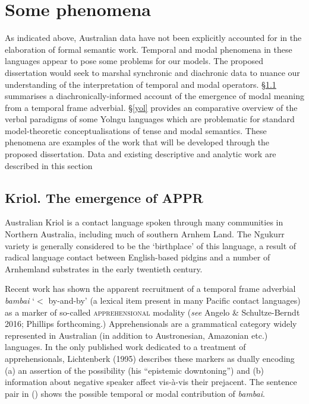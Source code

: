 \documentclass[12pt]{article}
\begin{document}
\section{Some phenomena}\label{phen}

As indicated above, Australian data have not been explicitly accounted for in the elaboration of formal semantic work. Temporal and modal phenomena in these languages appear to pose some problems for our models. The proposed dissertation would seek to marshal synchronic and diachronic data to nuance our understanding of the interpretation of temporal and modal operators. §\ref{rop} summarises a diachronically-informed account of the emergence of modal meaning from a temporal frame adverbial. §\ref{yol} provides an comparative overview of the verbal paradigms of some Yolngu languages which are problematic for standard model-theoretic conceptualisations of tense and modal semantics. These phenomena are examples of the work that will be developed through the proposed dissertation. Data and existing descriptive and analytic work are described in this section

\subsection{Kriol. The emergence of {\small\textsc{APPR}}}\label{rop}

Australian Kriol is a contact language spoken through many communities in Northern Australia, including much of southern Arnhem Land. The Ngukurr variety is generally considered to be the `birthplace' of this language, a result of radical language contact between English-based pidgins and a number of Arnhemland substrates in the early twentieth century.


Recent work has shown the apparent recruitment of a temporal frame adverbial \textit{bambai} `$<$ by-and-by' (a lexical item present in many Pacific contact languages) as a marker of so-called \textsc{apprehensional} modality (\textit{see} Angelo \& Schultze-Berndt 2016; Phillips forthcoming.) Apprehensionals are a grammatical category widely represented in Australian (in addition to Austronesian, Amazonian etc.) languages. In the only published work dedicated to a treatment of apprehensionals, Lichtenberk (1995) describes these markers as dually encoding (a) an assertion of the possibility (his ``epistemic downtoning'') and (b) information about negative speaker affect vis-à-vis their prejacent. The sentence pair in (\nextx) shows the possible temporal or modal contribution of \textit{bambai}. 
\end{document}
